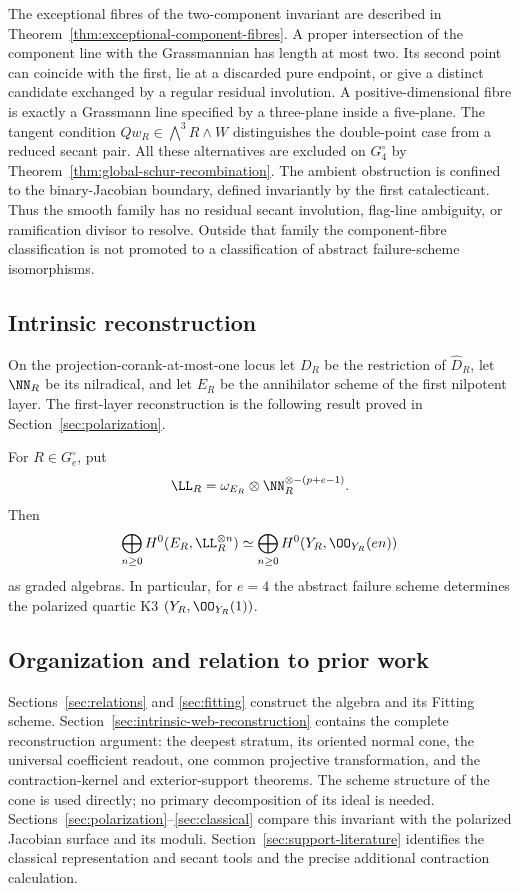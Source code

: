 The exceptional fibres of the two-component invariant are described in
Theorem~\ref{thm:exceptional-component-fibres}.  A proper intersection
of the component line with the Grassmannian has length at most two.
Its second point can coincide with the first, lie at a discarded pure
endpoint, or give a distinct candidate exchanged by a regular residual
involution.  A positive-dimensional fibre is exactly a Grassmann line
specified by a three-plane inside a five-plane.  The tangent condition
\(Qw_R\in\bigwedge^3R\wedge W\) distinguishes the double-point
case from a reduced secant pair.  All these alternatives are excluded on \(G_4^\circ\) by
Theorem~\ref{thm:global-schur-recombination}.  The ambient obstruction
is confined to the binary-Jacobian boundary, defined invariantly by the
first catalecticant.  Thus the smooth family has no residual secant
involution, flag-line ambiguity, or ramification divisor to resolve.
Outside that family the component-fibre classification is not promoted
to a classification of abstract failure-scheme isomorphisms.


\subsection{Intrinsic reconstruction}

On the projection-corank-at-most-one locus let \(D_R\) be the
restriction of \(\widehat D_R\), let \(\NN_R\) be its
nilradical, and let \(E_R\) be the annihilator scheme of the first
nilpotent layer.  The first-layer reconstruction is the following result
proved in Section~\ref{sec:polarization}.

\begin{theorem}
\label{thm:main-reconstruction}
For \(R\in G_e^\circ\), put
\[
 \LL_R=\omega_{E_R}\otimes
 \NN_R^{\otimes-(p+e-1)}.
\]
Then
\[
 \bigoplus_{n\ge0}H^0(E_R,\LL_R^{\otimes n})
 \simeq
 \bigoplus_{n\ge0}H^0(Y_R,\OO_{Y_R}(en))
\]
as graded algebras.  In particular, for \(e=4\) the abstract
failure scheme determines the polarized quartic K3
\((Y_R,\OO_{Y_R}(1))\).
\end{theorem}


\subsection{Organization and relation to prior work}

Sections~\ref{sec:relations} and \ref{sec:fitting} construct the algebra
and its Fitting scheme.  Section~\ref{sec:intrinsic-web-reconstruction}
contains the complete reconstruction argument: the deepest stratum,
its oriented normal cone, the universal coefficient readout, one
common projective transformation, and the contraction-kernel and
exterior-support theorems.  The scheme structure of the cone is
used directly; no primary decomposition of its ideal is needed.
Sections~\ref{sec:polarization}--\ref{sec:classical} compare this
invariant with the polarized Jacobian surface and its moduli.
Section~\ref{sec:support-literature} identifies the classical
representation and secant tools and the precise additional
contraction calculation.

